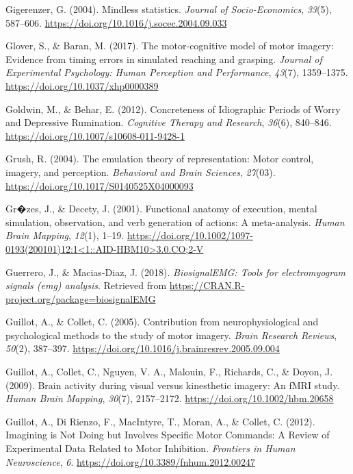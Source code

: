 \documentclass[a4paper,12pt,twoside,openright,oldfontcommands]{memoir}
\begin{document}
\hypertarget{ref-Gigerenzer2004}{}
Gigerenzer, G. (2004). Mindless statistics. \emph{Journal of
Socio-Economics}, \emph{33}(5), 587--606.
\url{https://doi.org/10.1016/j.socec.2004.09.033}

\hypertarget{ref-glover_motor-cognitive_2017}{}
Glover, S., \& Baran, M. (2017). The motor-cognitive model of motor
imagery: Evidence from timing errors in simulated reaching and grasping.
\emph{Journal of Experimental Psychology: Human Perception and
Performance}, \emph{43}(7), 1359--1375.
\url{https://doi.org/10.1037/xhp0000389}

\hypertarget{ref-goldwin_concreteness_2012}{}
Goldwin, M., \& Behar, E. (2012). Concreteness of Idiographic Periods of
Worry and Depressive Rumination. \emph{Cognitive Therapy and Research},
\emph{36}(6), 840--846. \url{https://doi.org/10.1007/s10608-011-9428-1}

\hypertarget{ref-grush_emulation_2004}{}
Grush, R. (2004). The emulation theory of representation: Motor control,
imagery, and perception. \emph{Behavioral and Brain Sciences},
\emph{27}(03). \url{https://doi.org/10.1017/S0140525X04000093}

\hypertarget{ref-grzes_functional_2001}{}
Gr�zes, J., \& Decety, J. (2001). Functional anatomy of execution,
mental simulation, observation, and verb generation of actions: A
meta-analysis. \emph{Human Brain Mapping}, \emph{12}(1), 1--19.
\href{https://doi.org/10.1002/1097-0193(200101)12:1\%3C1::AID-HBM10\%3E3.0.CO;2-V}{https://doi.org/10.1002/1097-0193(200101)12:1\textless{}1::AID-HBM10\textgreater{}3.0.CO;2-V}

\hypertarget{ref-R-biosignalEMG}{}
Guerrero, J., \& Macias-Diaz, J. (2018). \emph{BiosignalEMG: Tools for
electromyogram signals (emg) analysis}. Retrieved from
\url{https://CRAN.R-project.org/package=biosignalEMG}

\hypertarget{ref-guillot_contribution_2005}{}
Guillot, A., \& Collet, C. (2005). Contribution from neurophysiological
and psychological methods to the study of motor imagery. \emph{Brain
Research Reviews}, \emph{50}(2), 387--397.
\url{https://doi.org/10.1016/j.brainresrev.2005.09.004}

\hypertarget{ref-guillot_brain_2009}{}
Guillot, A., Collet, C., Nguyen, V. A., Malouin, F., Richards, C., \&
Doyon, J. (2009). Brain activity during visual versus kinesthetic
imagery: An fMRI study. \emph{Human Brain Mapping}, \emph{30}(7),
2157--2172. \url{https://doi.org/10.1002/hbm.20658}

\hypertarget{ref-guillot_imagining_2012}{}
Guillot, A., Di Rienzo, F., MacIntyre, T., Moran, A., \& Collet, C.
(2012). Imagining is Not Doing but Involves Specific Motor Commands: A
Review of Experimental Data Related to Motor Inhibition. \emph{Frontiers
in Human Neuroscience}, \emph{6}.
\url{https://doi.org/10.3389/fnhum.2012.00247}
\end{document}
